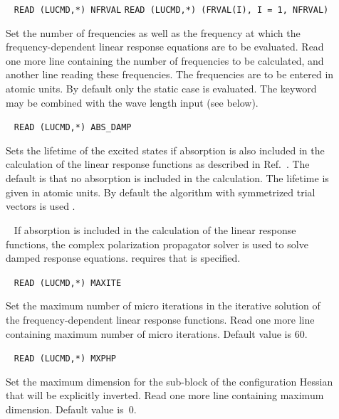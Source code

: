 \begin{description}

\item[]\verb| |\newline
\verb|READ (LUCMD,*) NFRVAL|\newline
\verb|READ (LUCMD,*) (FRVAL(I), I = 1, NFRVAL)|

Set the number of frequencies as well as the
frequency at which the
frequency-dependent linear response equations are to be evaluated.
Read one more line containing the number of frequencies to be
calculated, and another line reading these frequencies. The
frequencies are to be entered in atomic units. By default only the
static case is evaluated.
The  keyword may be combined with the wave length input
 (see below).

\item[]\verb| |\newline
\verb|READ (LUCMD,*) ABS_DAMP|

Sets the lifetime of the excited states if absorption is also included
in the calculation of the linear response functions as described in
Ref.~\cite{pndmbhjajjojcp115,pnkrthjcp120}. The default is that no
absorption is included in the calculation. The lifetime is given in
atomic units. By default the algorithm with symmetrized trial vectors is
used \cite{kauczor:2011}.

\item[]\verb| |\newline
If absorption is included in the calculation of the linear response
functions, the complex polarization propagator
solver \cite{pndmbhjajjojcp123,pndmbhjajjojcp115} 
is used to solve damped response equations.  requires that
 is specified.

\item[]\verb| |\newline
\verb|READ (LUCMD,*) MAXITE|

Set the maximum number of micro iterations in the iterative solution of
the frequency-dependent linear response functions. Read one more line
containing maximum number of micro iterations. Default value is
60.

\item[]\verb| |\newline
\verb|READ (LUCMD,*) MXPHP|

Set the maximum dimension for the sub-block of the configuration
Hessian that will be explicitly inverted. Read one more line
containing maximum dimension. Default value is~0.


\end{description}
